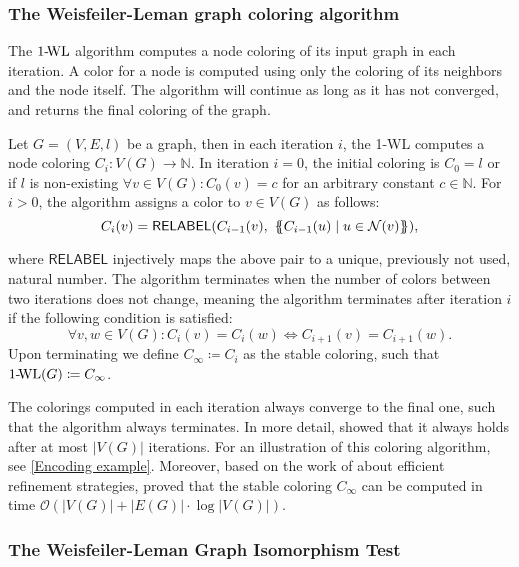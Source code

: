 \subsubsection{The Weisfeiler-Leman graph coloring algorithm}
The $\wl$ algorithm computes a node coloring of its input graph in each iteration. A color for a node is computed using only the coloring of its neighbors and the node itself. The algorithm will continue as long as it has not converged, and returns the final coloring of the graph.

\begin{definition}[$\wl$ Algorithm]
Let $G = (V, E, l)$ be a graph, then in each iteration $i$, the 1-WL computes a node coloring $C_i: V(G) \rightarrow \mathbb{N}$. In iteration $i=0$, the initial coloring is $C_0 = l$ or if $l$ is non-existing $\forall v \in V(G): C_0(v) = c$ for an arbitrary constant $c \in \mathbb{N}$. For $i > 0$, the algorithm assigns a color to $v \in V(G)$ as follows:
\begin{equation*}
C_i (v) = \textsf{RELABEL}(C_{i-1}(v),  \ \{\!\!\{ C_{i-1}(u) \mid u \in \mathcal{N}(v) \}\!\!\}),
\end{equation*}

\noindent where $\textsf{RELABEL}$ injectively maps the above pair to a unique, previously not used, natural number. The algorithm terminates when the number of colors between two iterations does not change, meaning the algorithm terminates after iteration $i$ if the following condition is satisfied:
\begin{equation*}
\forall v,w \in V(G):  C_i(v) = C_i(w) \iff C_{i+1}(v) = C_{i+1}(w).
\end{equation*}
Upon terminating we define $C_{\infty} \coloneqq C_i$ as the stable coloring, such that $\text{1-\!WL}(G) \coloneqq C_\infty$.
\end{definition}


The colorings computed in each iteration always converge to the final one, such that the algorithm always terminates. In more detail, \cite{Gro2017} showed that it always holds after at most $|V(G)|$ iterations.
For an illustration of this coloring algorithm, see \autoref{Encoding example}. Moreover, based on the work of \cite{Pai+87} about efficient refinement strategies, \cite{Car+82} proved that the stable coloring $C_\infty$ can be computed in time $\mathcal{O}(| V(G) | + |E(G)| \cdot \log | V(G) |)$.

\subsubsection{The Weisfeiler-Leman Graph Isomorphism Test}

